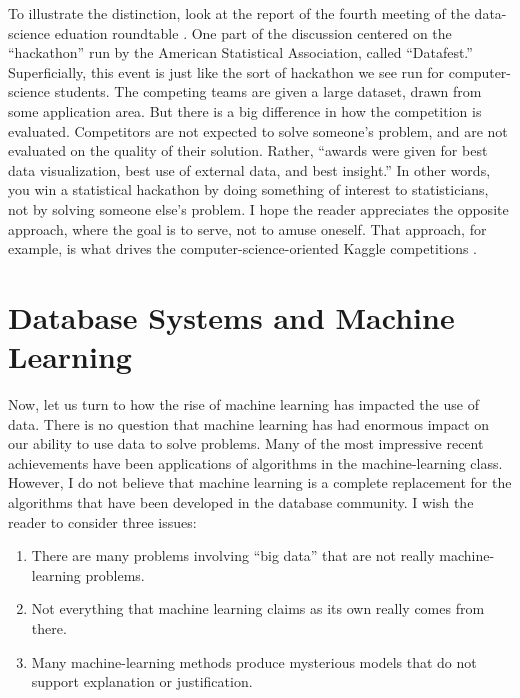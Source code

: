 \documentclass[11pt]{article}
\begin{document}
To illustrate the distinction, look at the report of the fourth meeting of the data-science eduation roundtable \cite{datafest}.  One part of the discussion centered on the ``hackathon'' run by the American Statistical Association, called ``Datafest.''  Superficially, this event is just like the sort of hackathon we see run for computer-science students.  The competing teams are given a large dataset, drawn from some application area.  But there is a big difference in how the competition is evaluated.  Competitors are not expected to solve someone's problem, and are not evaluated on the quality of their solution.  Rather, ``awards were given for best data visualization, best use of external data, and best insight.''  In other words, you win a statistical hackathon by doing something of interest to statisticians, not by solving someone else's problem.  I hope the reader appreciates the opposite approach, where the goal is to serve, not to amuse oneself.  That approach, for example, is what drives the computer-science-oriented Kaggle competitions \cite{kaggle}.

\section{Database Systems and Machine Learning}

Now, let us turn to how the rise of machine learning has impacted the use of data.  There is no question that machine learning has had enormous impact on our ability to use data to solve problems.  Many of the most impressive recent achievements have been applications of algorithms in the machine-learning class.  However, I do not believe that machine learning is a complete replacement for the algorithms that have been developed in the database community.  I wish the reader to consider three issues:

\begin{enumerate}

\item
There are many problems involving ``big data'' that are not really machine-learning problems.

\item
Not everything that machine learning claims as its own really comes from there.

\item
Many machine-learning methods produce mysterious models that do not support explanation or justification.

\end{enumerate}
\end{document}
